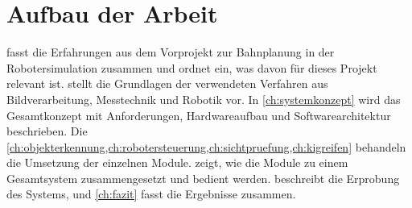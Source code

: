 \section{Aufbau der Arbeit}
 fasst die Erfahrungen aus dem Vorprojekt zur Bahnplanung in der
Robotersimulation zusammen und ordnet ein, was davon für dieses Projekt relevant ist.
 stellt die Grundlagen der verwendeten Verfahren aus Bildverarbeitung,
Messtechnik und Robotik vor. In \cref{ch:systemkonzept} wird das Gesamtkonzept mit
Anforderungen, Hardwareaufbau und Softwarearchitektur beschrieben. Die
\cref{ch:objekterkennung,ch:robotersteuerung,ch:sichtpruefung,ch:kigreifen} behandeln die
Umsetzung der einzelnen Module.  zeigt, wie die Module zu einem
Gesamtsystem zusammengesetzt und bedient werden.  beschreibt die
Erprobung des Systems, und \cref{ch:fazit} fasst die Ergebnisse zusammen.
